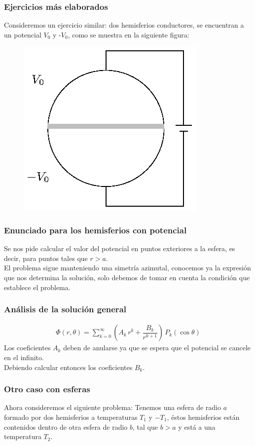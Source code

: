 \documentclass[12pt]{beamer}
\begin{document}
\begin{frame}
\frametitle{Ejercicios más elaborados}
Consideremos un ejercicio similar: dos hemisferios conductores, se encuentran a un potencial $V_{0}$ y -$V_{0}$, como se muestra en la siguiente figura:
\begin{figure}
    \centering
    \includegraphics[scale=0.8]{Imagenes/Ejemplo_Esfera_03.eps}
\end{figure}
\end{frame}
\begin{frame}
\frametitle{Enunciado para los hemisferios con potencial}
Se nos pide calcular el valor del potencial en puntos exteriores a la esfera, es decir, para puntos tales que $r > a$.
\\
\bigskip
\pause
El problema sigue manteniendo una simetría azimutal, conocemos ya la expresión que nos determina la solución, solo debemos de tomar en cuenta la condición que establece el problema.
\end{frame}
\begin{frame}
\frametitle{Análisis de la solución general}
\begin{align*}
\Phi (r, \theta) = \sum_{k=0}^{\infty} \left( A_{k} \, r^{k} + \dfrac{B_{k}}{r^{k+1}} \right) \, P_{k} (\cos \theta)
\end{align*}
Los coeficientes $A_{k}$ deben de anularse ya que se espera que el potencial se cancele en el infinito. \pause
\\
\bigskip
Debiendo calcular entonces los coeficientes $B_{k}$.
\end{frame}
\begin{frame}
\frametitle{Otro caso con esferas}
Ahora consideremos el siguiente problema: Tenemos una esfera de radio $a$ formado por dos hemisferios a temperaturas $T_{1}$ y $-T_{1}$, éstos hemisferios están contenidos dentro de otra esfera de radio $b$, tal que $b > a$ y está a una temperatura $T_{2}$.
\end{frame}
\end{document}
